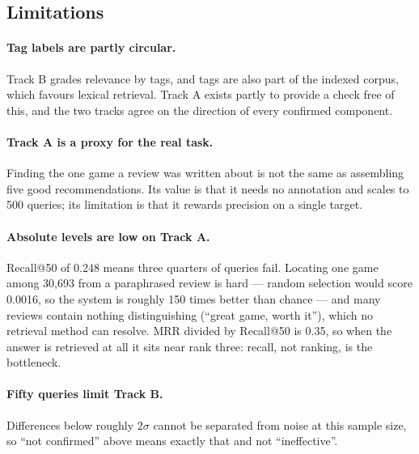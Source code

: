 \subsection{Limitations}
\label{sec:eval-limitations}

\paragraph{Tag labels are partly circular.}
Track B grades relevance by tags, and tags are also part of the indexed corpus,
which favours lexical retrieval. Track A exists partly to provide a check free
of this, and the two tracks agree on the direction of every confirmed
component.

\paragraph{Track A is a proxy for the real task.}
Finding the one game a review was written about is not the same as assembling
five good recommendations. Its value is that it needs no annotation and scales
to 500 queries; its limitation is that it rewards precision on a single target.

\paragraph{Absolute levels are low on Track A.}
Recall@50 of 0.248 means three quarters of queries fail. Locating one game
among 30,693 from a paraphrased review is hard --- random selection would score
0.0016, so the system is roughly 150 times better than chance --- and many
reviews contain nothing distinguishing (``great game, worth it''), which no
retrieval method can resolve. MRR divided by Recall@50 is 0.35, so when the
answer is retrieved at all it sits near rank three: recall, not ranking, is the
bottleneck.

\paragraph{Fifty queries limit Track B.}
Differences below roughly $2\sigma$ cannot be separated from noise at this
sample size, so ``not confirmed'' above means exactly that and not
``ineffective''.
